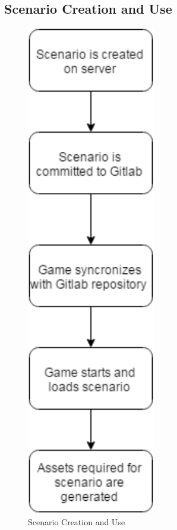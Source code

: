 \subsection{Scenario Creation and Use}
\begin{figure}[H]
\centering\includegraphics[width=0.5\textwidth, height=0.8\paperheight, keepaspectratio=true]{images/ScenarioLoading}
  \caption{Scenario Creation and Use}
  \label{fig:flow_scenario_loading}
\end{figure}